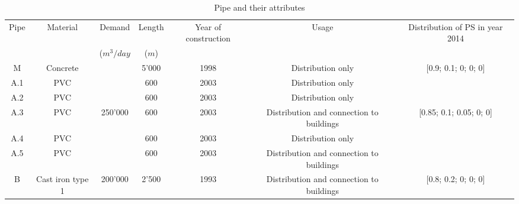 \begin{table}
\caption{Pipe and their attributes}
\label{tbl-reliability-a:5}
{
\begin{tabular}{|l|l|l|l|l|l|l|}
\hline
\multicolumn{1}{|c|}{Pipe} & \multicolumn{1}{c|}{Material} & \multicolumn{1}{c|}{Demand} & \multicolumn{1}{c|}{Length} & \multicolumn{1}{c|}{Year of construction} & \multicolumn{1}{c|}{Usage} & \multicolumn{1}{c|}{Distribution of PS in year 2014} \\ 
\multicolumn{1}{|c|}{} & \multicolumn{1}{c|}{} & \multicolumn{1}{c|}{($m^3/day$} & \multicolumn{1}{c|}{($m$)} & \multicolumn{1}{c|}{} & \multicolumn{1}{c|}{} & \multicolumn{1}{c|}{} \\ 
\hline
\multicolumn{1}{|c|}{M} & \multicolumn{1}{c|}{Concrete} & \multicolumn{1}{c|}{} & \multicolumn{1}{c|}{5'000} & \multicolumn{1}{c|}{1998} & \multicolumn{1}{c|}{Distribution only} & \multicolumn{1}{c|}{[0.9; 0.1; 0; 0; 0]} \\ 
\hline
\multicolumn{1}{|c|}{A.1} & \multicolumn{1}{c|}{PVC} & \multicolumn{1}{c|}{} & \multicolumn{1}{c|}{600} & \multicolumn{1}{c|}{2003} & \multicolumn{1}{c|}{Distribution only} & \multicolumn{1}{c|}{} \\ 
\cline{1-2}\cline{4-6}
\multicolumn{1}{|c|}{A.2} & \multicolumn{1}{c|}{PVC} & \multicolumn{1}{c|}{} & \multicolumn{1}{c|}{600} & \multicolumn{1}{c|}{2003} & \multicolumn{1}{c|}{Distribution only} & \multicolumn{1}{c|}{} \\ 
\cline{1-2}\cline{4-6}
\multicolumn{1}{|c|}{A.3} & \multicolumn{1}{c|}{PVC} & \multicolumn{1}{c|}{250'000} & \multicolumn{1}{c|}{600} & \multicolumn{1}{c|}{2003} & \multicolumn{1}{c|}{Distribution and connection to buildings} & \multicolumn{1}{c|}{[0.85; 0.1; 0.05; 0; 0]} \\ 
\cline{1-2}\cline{4-6}
\multicolumn{1}{|c|}{A.4} & \multicolumn{1}{c|}{PVC} & \multicolumn{1}{c|}{} & \multicolumn{1}{c|}{600} & \multicolumn{1}{c|}{2003} & \multicolumn{1}{c|}{Distribution only} & \multicolumn{1}{c|}{} \\ 
\cline{1-2}\cline{4-6}
\multicolumn{1}{|c|}{A.5} & \multicolumn{1}{c|}{PVC} & \multicolumn{1}{c|}{} & \multicolumn{1}{c|}{600} & \multicolumn{1}{c|}{2003} & \multicolumn{1}{c|}{Distribution and connection to buildings} & \multicolumn{1}{c|}{} \\ 
\hline
\multicolumn{1}{|c|}{B} & \multicolumn{1}{c|}{Cast iron type 1} & \multicolumn{1}{c|}{200'000} & \multicolumn{1}{c|}{2'500} & \multicolumn{1}{c|}{1993} & \multicolumn{1}{c|}{Distribution and connection to buildings} & \multicolumn{1}{c|}{[0.8; 0.2; 0; 0; 0]} \\ 

\end{tabular}}
\end{table}
